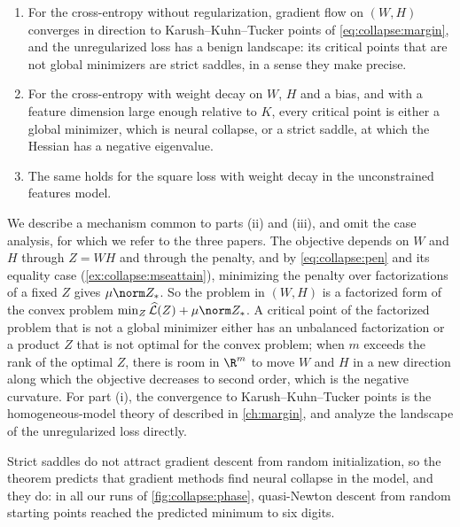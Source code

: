 \begin{refsection}
\begin{theorem}\label{thm:collapse:landscape}
\begin{enumerate}
\item \parencite{JiEtAl2022} For the cross-entropy without regularization, gradient flow on $(W,H)$ converges in direction to Karush--Kuhn--Tucker points of \eqref{eq:collapse:margin}, and the unregularized loss has a benign landscape: its critical points that are not global minimizers are strict saddles, in a sense they make precise.
\item \parencite{ZhuEtAl2021} For the cross-entropy with weight decay on $W$, $H$ and a bias, and with a feature dimension large enough relative to $K$, every critical point is either a global minimizer, which is neural collapse, or a strict saddle, at which the Hessian has a negative eigenvalue.
\item \parencite{ZhouEtAl2022} The same holds for the square loss with weight decay in the unconstrained features model.
\end{enumerate}
\end{theorem}

\begin{proofsketch}
We describe a mechanism common to parts (ii) and (iii), and omit the case analysis, for which we refer to the three papers. The objective depends on $W$ and $H$ through $Z=WH$ and through the penalty, and by \eqref{eq:collapse:pen} and its equality case (\cref{ex:collapse:mseattain}), minimizing the penalty over factorizations of a fixed $Z$ gives $\mu\collapsenuc Z$. So the problem in $(W,H)$ is a factorized form of the convex problem $\min_Z\Lhat(Z)+\mu\collapsenuc Z$. A critical point of the factorized problem that is not a global minimizer either has an unbalanced factorization or a product $Z$ that is not optimal for the convex problem; when $m$ exceeds the rank of the optimal $Z$, there is room in $\R^m$ to move $W$ and $H$ in a new direction along which the objective decreases to second order, which is the negative curvature. For part (i), the convergence to Karush--Kuhn--Tucker points is the homogeneous-model theory of \textcite{LyuLi2020} described in \cref{ch:margin}, and \textcite{JiEtAl2022} analyze the landscape of the unregularized loss directly.
\end{proofsketch}

Strict saddles do not attract gradient descent from random initialization, so the theorem predicts that gradient methods find neural collapse in the model, and they do: in all our runs of \cref{fig:collapse:phase}, quasi-Newton descent from random starting points reached the predicted minimum to six digits.


\end{refsection}
